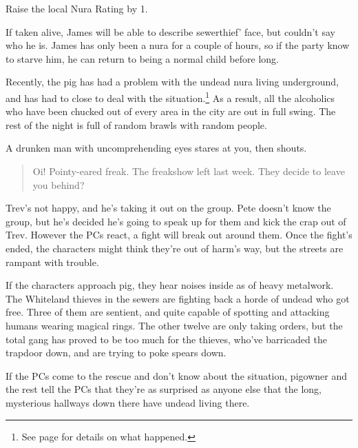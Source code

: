 \begin{multicols}{2}
Raise the local Nura Rating by 1.


If taken alive, James will be able to describe \gls{sewerthief}' face, but couldn't say who he is.
James has only been a nura for a couple of hours, so if the party know to starve him, he can return to being a normal child before long.


Recently, the \gls{pig} has had a problem with the undead nura living underground, and has had to close to deal with the situation.\footnote{See page \pageref{pig_pantry} for details on what happened.}
As a result, all the alcoholics who have been chucked out of every area in the city are out in full swing.
The rest of the night is full of random brawls with random people.

\begin{boxtext}

A drunken man with uncomprehending eyes stares at you, then shouts.

\begin{quotation}

	Oi! Pointy-eared freak.  The freakshow left last week.  They decide to leave you behind?

\end{quotation}

\end{boxtext}

Trev's not happy, and he's taking it out on the group.
Pete doesn't know the group, but he's decided he's going to speak up for them and kick the crap out of Trev.
However the PCs react, a fight will break out around them.
Once the fight's ended, the characters might think they're out of harm's way, but the streets are rampant with trouble.


If the characters approach \gls{pig}, they hear noises inside as of heavy metalwork.  The Whiteland thieves in the sewers are fighting back a horde of undead who got free.  Three of them are sentient, and quite capable of spotting and attacking humans wearing magical rings.  The other twelve are only taking orders, but the total gang has proved to be too much for the thieves, who've barricaded the trapdoor down, and are trying to poke spears down.

If the PCs come to the rescue and don't know about the situation, \gls{pigowner} and the rest tell the PCs that they're as surprised as anyone else that the long, mysterious hallways down there have undead living there.


\end{multicols}
